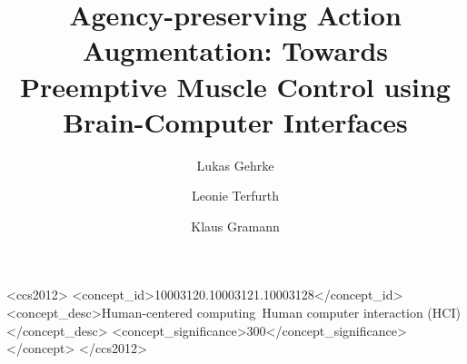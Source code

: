 \documentclass[manuscript, screen=true, review=true, anonymous=true, authordraft=False]{acmart}
\begin{document}
\title[Towards Preemptive Muscle Control using Brain-Computer Interfaces]{Agency-preserving Action Augmentation: Towards Preemptive Muscle Control using Brain-Computer Interfaces}




\author{Lukas Gehrke}

\author{Leonie Terfurth}

\author{Klaus Gramann}

\renewcommand{\shortauthors}{Gehrke et al.}

\begin{abstract}

\end{abstract}


\begin{CCSXML}
<ccs2012>
    <concept_id>10003120.10003121.10003128</concept_id>
        <concept_desc>Human-centered computing~Human computer interaction (HCI)</concept_desc>
        <concept_significance>300</concept_significance>
    </concept>
 </ccs2012>
\end{CCSXML}
\end{document}
